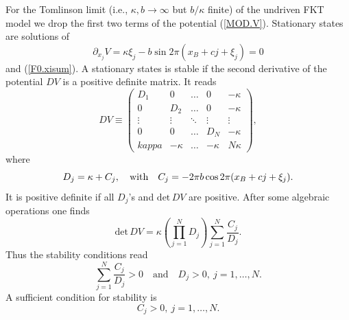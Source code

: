 For the Tomlinson limit (i.e., $\kappa,b\to\infty$ but $b/\kappa$
finite) of the undriven FKT model we drop the first two terms of the
potential (\ref{MOD.V}). Stationary states are solutions of
\begin{equation}
  \partial_{x_j}V=\kappa\xi_j-b\sin 2\pi(x_B+cj+\xi_j)=0
  \label{AP1.xi}
\end{equation}
and (\ref{F0.xisum}).
A stationary states is stable if the second derivative of the
potential $DV$ is a positive definite matrix. It reads
\begin{equation}
 DV\equiv\left(\begin{array}{ccccc}D_1&0&\ldots&0&-\kappa\\
   0&D_2&\ldots&0&-\kappa\\\vdots&\vdots&\ddots&\vdots&\vdots\\0&0&
   \ldots&D_N&-\kappa\\kappa&-\kappa&\ldots&-\kappa&N\kappa
   \end{array}\right),
  \label{AP1.DV}
\end{equation}
where
\begin{equation}
  D_j=\kappa+C_j,\quad{\rm with}\quad C_j=-2\pi b\cos 
   2\pi(x_B+cj+\xi_j).
  \label{AP1.D}
\end{equation}
It is positive definite if all $D_j$'s and $\mbox{det}\,DV$ are
positive. After some algebraic operations one finds
\begin{equation}
  \mbox{det}\,DV=\kappa\left(\prod_{j=1}^ND_j\right)\sum_{j=1}^N
   \frac{C_j}{D_j}.
  \label{AP1.det}
\end{equation}
Thus the stability conditions read
\begin{equation}
  \sum_{j=1}^N\frac{C_j}{D_j}>0\quad\mbox{and}\quad D_j>0,
   \ j=1,\ldots,N.
  \label{AP1.stab}
\end{equation}
A sufficient condition for stability is
\begin{equation}
  C_j>0,\ j=1,\ldots,N.
  \label{AP1.suf.stab}
\end{equation}

